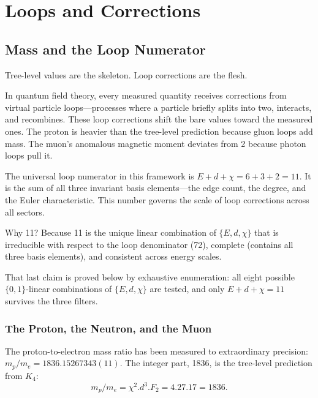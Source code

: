 \documentclass[11pt,a4paper]{book}
\def\cdot{.}%
\newcommand{\VoidRef}[2]{\textit{#2} (in \textit{Void})}
\begin{document}
\part{Loops and Corrections}

\chapter{Mass and the Loop Numerator}
\label{ch:mass-loop-numerator}

Tree-level values are the skeleton. Loop corrections are the flesh.

In quantum field theory, every measured quantity receives corrections from virtual particle loops---processes where a particle briefly splits into two, interacts, and recombines. These loop corrections shift the bare values toward the measured ones. The proton is heavier than the tree-level prediction because gluon loops add mass. The muon's anomalous magnetic moment deviates from 2 because photon loops pull it.

The universal loop numerator in this framework is $E + d + \chi = 6 + 3 + 2 = 11$. It is the sum of all three invariant basis elements---the edge count, the degree, and the Euler characteristic. This number governs the scale of loop corrections across all sectors.

Why 11? Because 11 is the unique linear combination of $\{E, d, \chi\}$ that is irreducible with respect to the loop denominator (72), complete (contains all three basis elements), and consistent across energy scales.%

That last claim is proved below by exhaustive enumeration: all eight possible $\{0,1\}$-linear combinations of $\{E, d, \chi\}$ are tested, and only $E + d + \chi = 11$ survives the three filters.

\section{The Proton, the Neutron, and the Muon}

The proton-to-electron mass ratio has been measured to extraordinary precision: $m_p/m_e = 1836.15267343(11)$. The integer part, 1836, is the tree-level prediction from $K_4$:
\[
m_p/m_e = \chi^2 \cdot d^3 \cdot F_2 = 4 \cdot 27 \cdot 17 = 1836.
\]
\end{document}
